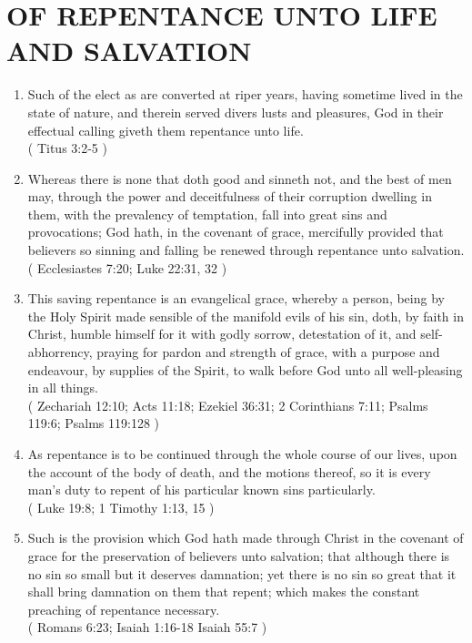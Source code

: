 \documentclass[12pt,a4paper]{book}
\begin{document}
\chapter{OF REPENTANCE UNTO LIFE AND SALVATION}
\label{ch-rep-sal}
\begin{enumerate}
\item Such of the elect as are converted at riper years, having sometime lived in the state of nature, and therein served divers lusts and pleasures, God in their effectual calling giveth them repentance unto life.\\
( Titus 3:2-5 )
\item Whereas there is none that doth good and sinneth not, and the best of men may, through the power and deceitfulness of their corruption dwelling in them, with the prevalency of temptation, fall into great sins and provocations; God hath, in the covenant of grace, mercifully provided that believers so sinning and falling be renewed through repentance unto salvation.\\
( Ecclesiastes 7:20; Luke 22:31, 32 )
\item This saving repentance is an evangelical grace, whereby a person, being by the Holy Spirit made sensible of the manifold evils of his sin, doth, by faith in Christ, humble himself for it with godly sorrow, detestation of it, and self-abhorrency, praying for pardon and strength of grace, with a purpose and endeavour, by supplies of the Spirit, to walk before God unto all well-pleasing in all things.\\
( Zechariah 12:10; Acts 11:18; Ezekiel 36:31; 2 Corinthians 7:11; Psalms 119:6; Psalms 119:128 )
\item As repentance is to be continued through the whole course of our lives, upon the account of the body of death, and the motions thereof, so it is every man's duty to repent of his particular known sins particularly.\\
( Luke 19:8; 1 Timothy 1:13, 15 )
\item Such is the provision which God hath made through Christ in the covenant of grace for the preservation of believers unto salvation; that although there is no sin so small but it deserves damnation; yet there is no sin so great that it shall bring damnation on them that repent; which makes the constant preaching of repentance necessary.\\
( Romans 6:23; Isaiah 1:16-18 Isaiah 55:7 )
\end{enumerate}
\end{document}
